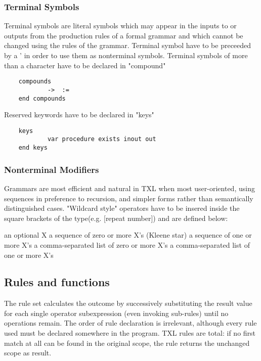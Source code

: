 	\subsubsection{Terminal Symbols}
	Terminal symbols are literal symbols which may appear in the inputs to or outputs from the production rules of a formal grammar and which cannot be changed using the rules of the grammar. Terminal symbol have to be preceeded by a ' in order to use them as nonterminal symbols.
	Terminal symbols of more than a character have to be declared in "compound"
	
	\begin{lstlisting}	
	compounds
	        ->  :=
	end compounds
	\end{lstlisting}
	
	Reserved keywords have to be declared in "keys"
	
	\begin{lstlisting}
	keys
	        var procedure exists inout out
	end keys
	\end{lstlisting}
	
	\subsubsection{Nonterminal Modifiers}
	Grammars are most efficient and natural in TXL when most user-oriented, using sequences in preference to recursion, and simpler forms rather than semantically distinguished cases. "Wildcard style" operators have to be insered inside the square brackets of the type(e.g. [repeat number]) and are defined below:
	\begin{itemize}
	\itembf{[opt X]:} an optional X
	\itembf{[repeat X]:} a sequence of zero	or more X's (Kleene star)
	\itembf{[repeat X+]:} a sequence of one	or more X's
	\itembf{[list X]:} a comma-separated list of zero or more X's
	\itembf{[list X+]:} a comma-separated list of one or more X's
	\end{itemize}
	
	\subsection{Rules and functions}
	The rule set calculates the outcome by successively substituting the result value for each single operator subexpression (even invoking sub-rules) until no operations remain. The order of rule declaration is irrelevant, although every rule used must be declared somewhere in the program. TXL rules are total: if no first match at all can be found in the original scope, the rule returns the unchanged scope as result.
	
